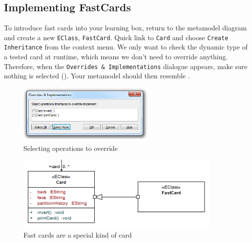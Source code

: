 \newpage
\subsection{Implementing FastCards}
\genHeader
\hypertarget{fastCard vis}{}

\begin{stepbystep}

\item To introduce fast cards into your learning box, return to the metamodel diagram and create a new \texttt{EClass},
\texttt{FastCard}. Quick link to \texttt{Card} and choose \texttt{Create Inheritance} from the context menu. We only want to check the dynamic type of a
tested card at runtime, which means we don't need to override anything. Therefore, when the \texttt{Overrides \& Implementations} dialogue appears, make sure
nothing is selected (). Your metamodel should then resemble .

\vspace{0.5cm}

\begin{figure}[htp]
\begin{center}
  \includegraphics[width=0.6\textwidth]{../../org.moflon.doc.handbook.03_storyDiagrams/11_fastCards/visFCImages/ea_overrideDialogueModified}
  \caption{Selecting operations to override}  
  \label{ea:dialogue_override}
\end{center}
\end{figure}

\begin{figure}[htp]
\begin{center}
  \includegraphics[width=0.9\textwidth]{../../org.moflon.doc.handbook.03_storyDiagrams/11_fastCards/visFCImages/ea_EClassFastCard}
  \caption{Fast cards are a special kind of card}  
  \label{ea:metamodel_FastCard}
\end{center}
\end{figure}


\end{stepbystep}
